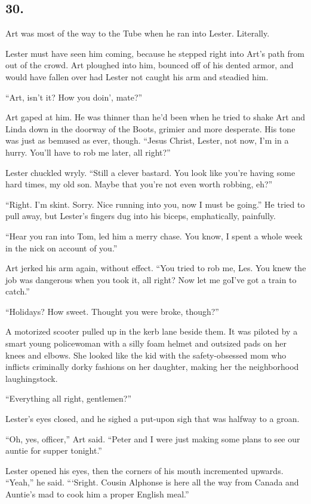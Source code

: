 \subsection{30.}

Art was most of the way to the Tube when he ran into Lester.
Literally.

Lester must have seen him coming, because he stepped right into
Art’s path from out of the crowd. Art ploughed into him, bounced
off of his dented armor, and would have fallen over had Lester not
caught his arm and steadied him.

“Art, isn’t it? How you doin’, mate?”

Art gaped at him. He was thinner than he’d been when he tried to
shake Art and Linda down in the doorway of the Boots, grimier and
more desperate. His tone was just as bemused as ever, though.
“Jesus Christ, Lester, not now, I’m in a hurry. You’ll have to rob
me later, all right?”

Lester chuckled wryly. “Still a clever bastard. You look like
you’re having some hard times, my old son. Maybe that you’re not
even worth robbing, eh?”

“Right. I’m skint. Sorry. Nice running into you, now I must be
going.” He tried to pull away, but Lester’s fingers dug into his
biceps, emphatically, painfully.

“Hear you ran into Tom, led him a merry chase. You know, I spent a
whole week in the nick on account of you.”

Art jerked his arm again, without effect. “You tried to rob me,
Les. You knew the job was dangerous when you took it, all right?
Now let me go{\dash}I’ve got a train to catch.”

“Holidays? How sweet. Thought you were broke, though?”

A motorized scooter pulled up in the kerb lane beside them. It was
piloted by a smart young policewoman with a silly foam helmet and
outsized pads on her knees and elbows. She looked like the kid with
the safety-obsessed mom who inflicts criminally dorky fashions on
her daughter, making her the neighborhood laughingstock.

“Everything all right, gentlemen?”

Lester’s eyes closed, and he sighed a put-upon sigh that was
halfway to a groan.

“Oh, yes, officer,” Art said. “Peter and I were just making some
plans to see our auntie for supper tonight.”

Lester opened his eyes, then the corners of his mouth incremented
upwards. “Yeah,” he said. “‘Sright. Cousin Alphonse is here all the
way from Canada and Auntie’s mad to cook him a proper English
meal.”

